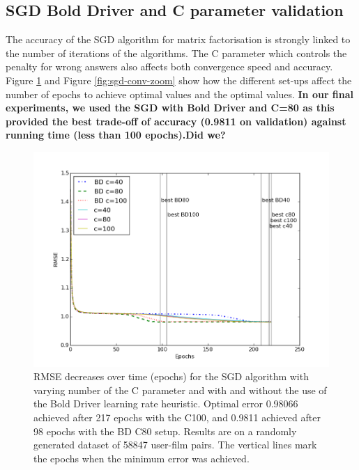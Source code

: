 \documentclass[10pt,conference,compsocconf]{IEEEtran}
\begin{document}
\subsection{SGD Bold Driver and C parameter validation}
The accuracy of the SGD algorithm for matrix factorisation is strongly linked to the number of iterations of the algorithms. The C parameter which controls the penalty for wrong answers also affects both convergence speed and accuracy. Figure \ref{fig:sgd-conv} and Figure \ref{fig:sgd-conv-zoom} show how the different set-ups affect the number of epochs to achieve optimal values and the optimal values. \textbf{In our final experiments, we used the SGD with Bold Driver and C=80 as this provided the best trade-off of accuracy (0.9811 on validation) against running time (less than 100 epochs).Did we?}


\begin{figure}[tbp]
  \centering
  \includegraphics[width=\columnwidth]{convergence_speed_all.png}
  \caption{RMSE decreases over time (epochs) for the SGD algorithm with varying number of the C parameter and with and without the use of the Bold Driver learning rate heuristic. Optimal error 0.98066 achieved after 217 epochs with the C100, and 0.9811 achieved after 98 epochs with the BD C80 setup. Results are on a randomly generated dataset of 58847 user-film pairs. The vertical lines mark the epochs when the minimum error was achieved.}
  \label{fig:sgd-conv}
\end{figure}
\end{document}
